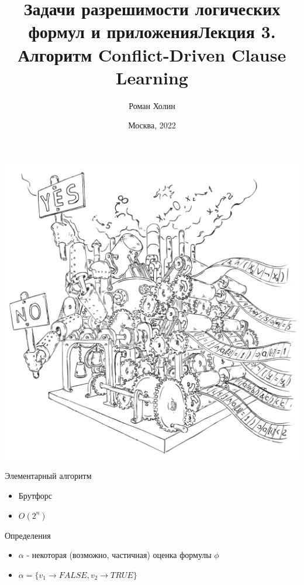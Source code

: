 \documentclass{beamer}
\begin{document}
\title{Задачи разрешимости логических формул и приложения\newline Лекция 3. Алгоритм Conflict-Driven Clause Learning}
\author{Роман Холин}
\date{Москва, 2022}

\begin{frame}
\includegraphics[scale=0.5]{../decision-procedure.png}
\end{frame}

\frame{\titlepage}

\begin{frame}{Элементарный алгоритм}
\begin{itemize}
\item Брутфорс
\item $O(2^n)$
\end{itemize}
\end{frame}

\begin{frame}{Определения}
\begin{itemize}
\item $\alpha$ - некоторая (возможно, частичная) оценка формулы $\phi$
\item $\alpha = \{v_1 \rightarrow FALSE, v_2 \rightarrow TRUE\}$
\end{itemize}
\end{frame}
\end{document}
